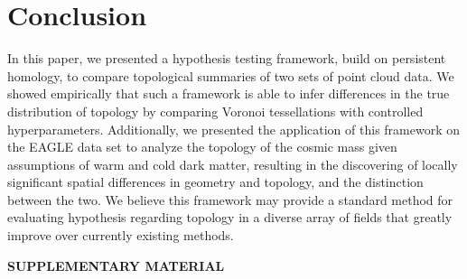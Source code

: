 \documentclass[12pt]{article}
\begin{document}

\section{Conclusion}
\label{sec:conc}
In this paper, we presented a hypothesis testing framework, build on persistent homology, to compare topological summaries of two sets of point cloud data. We showed empirically that such a framework is able to infer differences in the true distribution of topology by comparing Voronoi tessellations with controlled hyperparameters. Additionally, we presented the application of this framework on the EAGLE data set to analyze the topology of the cosmic mass given assumptions of warm and cold dark matter, resulting in the discovering of locally significant spatial differences in geometry and topology, and the distinction between the two. We believe this framework may provide a standard method for evaluating hypothesis regarding topology in a diverse array of fields that greatly improve over currently existing methods. 


\bigskip
\begin{center}
{\large\bf SUPPLEMENTARY MATERIAL}
\end{center}
\end{document}

